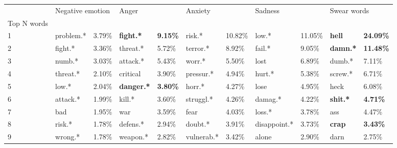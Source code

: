 \begin{tabular}{lllllllllll}
\toprule
{} & \multicolumn{2}{l}{Negative emotion} & \multicolumn{2}{l}{Anger} & \multicolumn{2}{l}{Anxiety} & \multicolumn{2}{l}{Sadness} & \multicolumn{2}{l}{Swear words} \\
Top N words          &                  &            &                    &                  &              &            &               &            &                  &                   \\
\midrule
1                    &        problem.* &     3.79\% &   \textbf{fight.*} &  \textbf{9.15\%} &       risk.* &    10.82\% &         low.* &    11.05\% &    \textbf{hell} &  \textbf{24.09\%} \\
2                    &          fight.* &     3.36\% &           threat.* &           5.72\% &     terror.* &     8.92\% &        fail.* &     9.05\% &  \textbf{damn.*} &  \textbf{11.48\%} \\
3                    &           numb.* &     3.03\% &           attack.* &           5.43\% &       worr.* &     5.50\% &          lost &     6.89\% &           dumb.* &            7.11\% \\
4                    &         threat.* &     2.10\% &           critical &           3.90\% &    pressur.* &     4.94\% &        hurt.* &     5.38\% &          screw.* &            6.71\% \\
5                    &            low.* &     2.04\% &  \textbf{danger.*} &  \textbf{3.80\%} &       horr.* &     4.27\% &          lose &     4.95\% &             heck &            6.08\% \\
6                    &         attack.* &     1.99\% &             kill.* &           3.60\% &    struggl.* &     4.26\% &       damag.* &     4.22\% &  \textbf{shit.*} &   \textbf{4.71\%} \\
7                    &              bad &     1.95\% &                war &           3.59\% &         fear &     4.03\% &        loss.* &     3.78\% &              ass &            4.47\% \\
8                    &           risk.* &     1.78\% &           defens.* &           2.94\% &      doubt.* &     3.91\% &  disappoint.* &     3.73\% &    \textbf{crap} &   \textbf{3.43\%} \\
9                    &          wrong.* &     1.78\% &           weapon.* &           2.82\% &   vulnerab.* &     3.42\% &         alone &     2.90\% &             darn &            2.75\% \\

\end{tabular}
